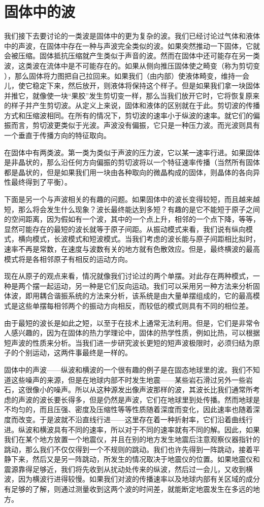 \section{固体中的波}

我们接下去要讨论的一类波是固体中的更为复杂的波。我们已经讨论过气体和液体中的声波，在固体中存在一种与声波完全类似的波。如果突然推动一下固体，它就会被压缩。固体抵抗压缩就产生类似于声音的波。然而在固体中还可能存在另一类波，这类波在流体中是不可能存在的。如果从侧向推压固体使之畸变（称为剪切变 ），那么固体将力图把自己拉回来。如果我们（由内部）使液体畸变，维持一会儿，使它稳定下来，然后放开，则液体将保持这个样子。但是如果我们拿一块固体并推它，就像使一块“果胶”发生剪切变一样，那么当我们放开它时，它将恢复原来的样子并产生剪切波。从定义上来说，固体和液体的区别就在于此。剪切波的传播方式和压缩波相同。在所有的情况下，剪切波的速率小于纵波的速率。就它们的偏振而言，剪切波更类似于光波。声波没有偏振，它只是一种压力波。而光波则具有一个垂直于传播方向的特征取向。

在固体中有两类波。第一类为类似于声波的压力波，它以某一速率行进。如果固体是非晶状的，那么沿任何方向偏振的剪切波将以一个特征速率传播（当然所有固体都是晶状的，但是如果我们用一块由各种取向的微晶构成的固体，则晶体的各向异性最终得到了平衡）。

下面是另一个与声波相关的有趣的问题。如果固体中的波长变得较短，而且越来越短，那么将会发生什么现象？波长最终能达到多短？有趣的是它不能短于原子之间的空间距离，因为假如有一个波，其中的一个点上升，相邻的一个点下降，等等，显然可能存在的最短的波长就等于原子间距。从振动模式来看，我们说有纵向模式，横向模式，长波模式和短波模式。当我们考虑的波长能与原子间距相比拟时，速率不再是常数，在速度与波数有关的地方就有色散效应。但是，最终横波的最高模式将是各相邻原子有相反的运动方向。

现在从原子的观点来看，情况就像我们讨论过的两个单摆。对此存在两种模式，一种是两个摆一起运动，另一种是它们反向运动。我们可以采用另一种方法来分析固体波，即用耦合谐振系统的方法来分析，该系统是由大量单摆组成的，它的最高模式是这些单摆每相邻两个的振动方向相反，而较低的模式则具有不同的相位差。

由于最短的波长是如此之短，以至于在技术上通常无法利用。但是，它们是非常令人感兴趣的，因为在固体的热力学理论中，固体的热学性质，例如比热，可以根据短声波的性质来分析。当我们进一步研究波长更短的短声波极限时，必须归结为原子的个别运动，这两件事最终是一样的。

固体中的声波——纵波和横波的一个很有趣的例子是在固态地球里的波。我们不知道这些噪声的来源，但是在地球内部不时发生地震——某些岩石滑过另外一些岩石，这很像小的噪声。所以从这种源发出像声波那样的波，其波长比我们通常所考虑的声波的波长要长得多，但是仍然是声波，它们在地球里到处传播。然而地球是不均匀的，而且压强、密度及压缩性等等性质随着深度而变化，因此速率也随着深度而改变。于是波就不沿直线行进——这里存在着一种折射率，它们沿着曲线行进。纵波和横波具有不同的速率，所以对于不同的速率就有不同的解。因此，如果我们在某个地方放置一个地震仪，并且在别的地方发生地震后注意观察仪器指针的跳动，那么我们不仅仅得到一个不规则的跳动。我们也许先得到一阵跳动，接着平静下来，然后又是另一阵跳动，所发生的情况取决于地震仪的位置。如果地震仪和震源靠得足够近，我们将先收到从扰动处传来的纵波，然后过一会儿，又收到横波，因为横波行进得较慢。如果我们对波的传播速率以及地球内部有关区域的成分有足够的了解，则通过测量收到这两个波的时间差，就能断定地震发生在多远的地方。

